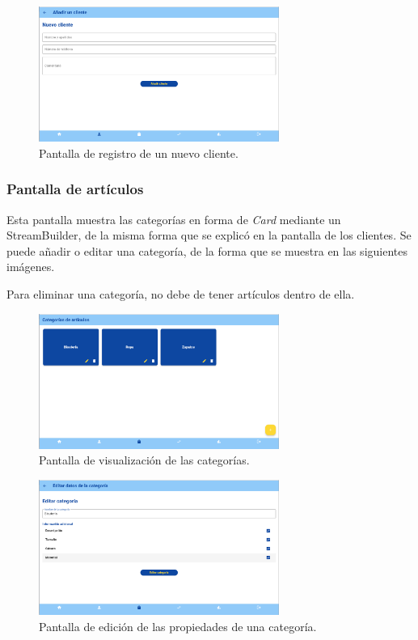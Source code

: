 \begin{figure}[H]
	\centering
	\includegraphics[width=0.7\textwidth]{imagenes/TerceraIteracion/newClient.png}
	\caption{Pantalla de registro de un nuevo cliente.}
\end{figure}

\newpage

\subsubsection{Pantalla de artículos}

Esta pantalla muestra las categorías en forma de \textit{Card} mediante un StreamBuilder, de la misma forma que se explicó en la pantalla de los clientes. Se puede añadir o editar una categoría, de la forma que se muestra en las siguientes imágenes. 

Para eliminar una categoría, no debe de tener artículos dentro de ella. 

\begin{figure}[H]
	\centering
	\includegraphics[width=0.7\textwidth]{imagenes/TerceraIteracion/categoryView.png}
	\caption{Pantalla de visualización de las categorías.}
\end{figure}

\begin{figure}[H]
	\centering
	\includegraphics[width=0.7\textwidth]{imagenes/TerceraIteracion/categoryEdit.png}
	\caption{Pantalla de edición de las propiedades de una categoría.}
\end{figure}


